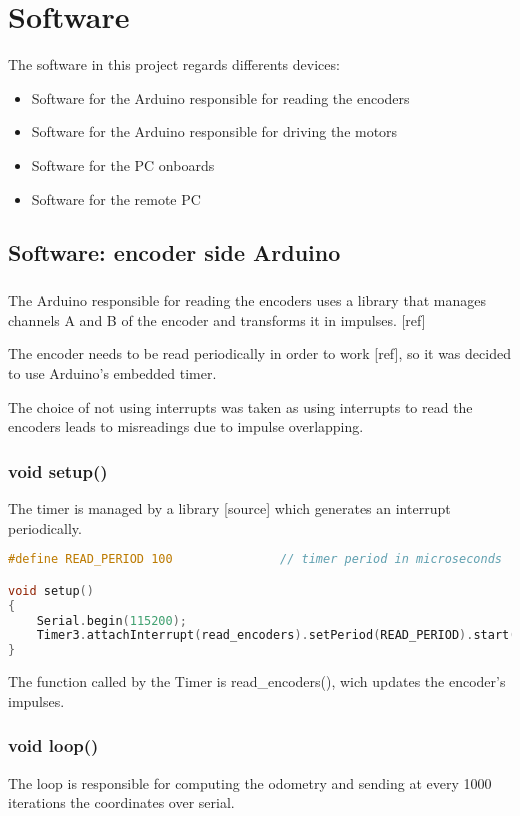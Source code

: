 \chapter{Software}
The software in this project regards differents devices:
\begin{itemize}
    \item Software for the Arduino responsible for reading the encoders
    \item Software for the Arduino responsible for driving the motors
    \item Software for the PC onboards
    \item Software for the remote PC 
\end{itemize}

\section{Software: encoder side Arduino}
\paragraph{}
The Arduino responsible for reading the encoders uses a library that manages channels A and B of the encoder and transforms it in impulses. [ref]
\par
The encoder needs to be read periodically in order to work [ref], so it was decided to use Arduino's embedded timer. 
\par
The choice of not using interrupts was taken as using interrupts to read the encoders leads to misreadings due to impulse overlapping.

\subsection{void setup()}
The timer is managed by a library [source] which generates an interrupt periodically.

\begin{lstlisting}[language=C]
#define READ_PERIOD 100               // timer period in microseconds

void setup()
{
    Serial.begin(115200);
    Timer3.attachInterrupt(read_encoders).setPeriod(READ_PERIOD).start();
}
\end{lstlisting}

The function called by the Timer is read\_encoders(), wich updates the encoder's impulses.

\subsection{void loop()}
The loop is responsible for computing the odometry and sending at every 1000 iterations the coordinates over serial.

